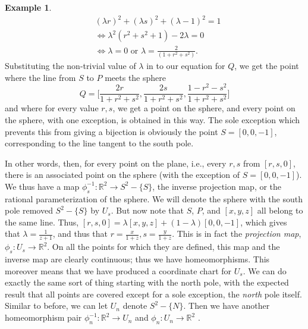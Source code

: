 \documentclass[a4paper]{book}
\theoremstyle{definition}
\newtheorem{example}{Example}[section]
\theoremstyle{definition}
\theoremstyle{definition}
\theoremstyle{theorem}
\theoremstyle{definition}
\begin{document}
\begin{example}
	\begin{align*}
	& (\lambda r)^2 + (\lambda s)^2 + (\lambda - 1)^2 = 1 \\
	& \iff \lambda^2(r^2 + s^2 +1) - 2\lambda = 0 \\
	& \iff \lambda = 0 \text{ or } \lambda = \frac{2}{(1+r^2+s^2)}.
	\end{align*}
	Substituting the non-trivial value of $\lambda$ in to our equation for $Q$, we get the point where the line from $S$ to $P$ meets the sphere
	\begin{equation*}
	Q = \Big[\frac{2r}{1+r^2+s^2}, \frac{2s}{1+r^2+s^2}, \frac{1-r^2-s^2}{1+r^2+s^2} \Big]
	\end{equation*}    
	and where for every value $r,s$, we get a point on the sphere, and every point on the sphere, with one exception, is obtained in this way. The sole exception which prevents this from giving a bijection is obviously the point $S = [0,0,-1]$, corresponding to the line tangent to the south pole. \par 
	In other words, then, for every point on the plane, i.e., every $r,s$ from $[r,s,0]$, there is an associated point on the sphere (with the exception of $S = [0,0,-1]$). We thus have a map $\phi^{-1}_s: \mathbb{R}^2 \rightarrow S^2 -\{S\}$, the inverse projection map, or the rational parameterization of the sphere. We will denote the sphere with the south pole removed $S^2 - \{S\}$ by $U_s$. But now note that $S$, $P$, and $[x,y,z]$ all belong to the same line. Thus, $[r,s,0] = \lambda [x,y,z] + (1 - \lambda)[0,0,-1]$, which gives that $\lambda = \frac{1}{z+1}$, and thus that $r = \frac{x}{1+z}, s = \frac{y}{1+z}$. This is in fact the \textit{projection map}, $\phi_s: U_s \rightarrow \mathbb{R}^2$. On all the points for which they are defined, this map and the inverse map are clearly continuous; thus we have homeomorphisms. This moreover means that we have produced a coordinate chart for $U_s$. We can do exactly the same sort of thing starting with the north pole, with the expected result that all points are covered except for a sole exception, the \textit{north} pole itself. Similar to before, we can let $U_n$ denote $S^2 - \{N\}$. Then we have another homeomorphism pair $\phi^{-1}_n:\mathbb{R}^2 \rightarrow U_n$ and $\phi_n: U_n \rightarrow \mathbb{R}^2$ . \par 

\end{example}
\end{document}
